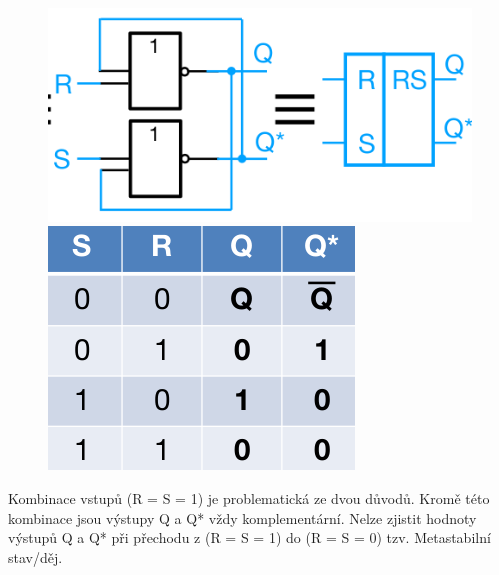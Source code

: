 \begin{figure}[h!]
    \centering
    \begin{minipage}[b]{0.4\textwidth}
        \includegraphics[scale = 0.4]{img/RSor.png}
    \end{minipage}
    \hfill
    \begin{minipage}[b]{0.4\textwidth}
        \includegraphics[scale = 0.3]{img/RSTab.png}
    \end{minipage}
\end{figure}

Kombinace vstupů (R = S = 1) je problematická ze dvou důvodů. Kromě této kombinace jsou výstupy Q a Q* vždy komplementární. Nelze zjistit hodnoty výstupů Q a Q* při přechodu z (R = S = 1) do (R = S = 0) tzv. Metastabilní stav/děj.\\

